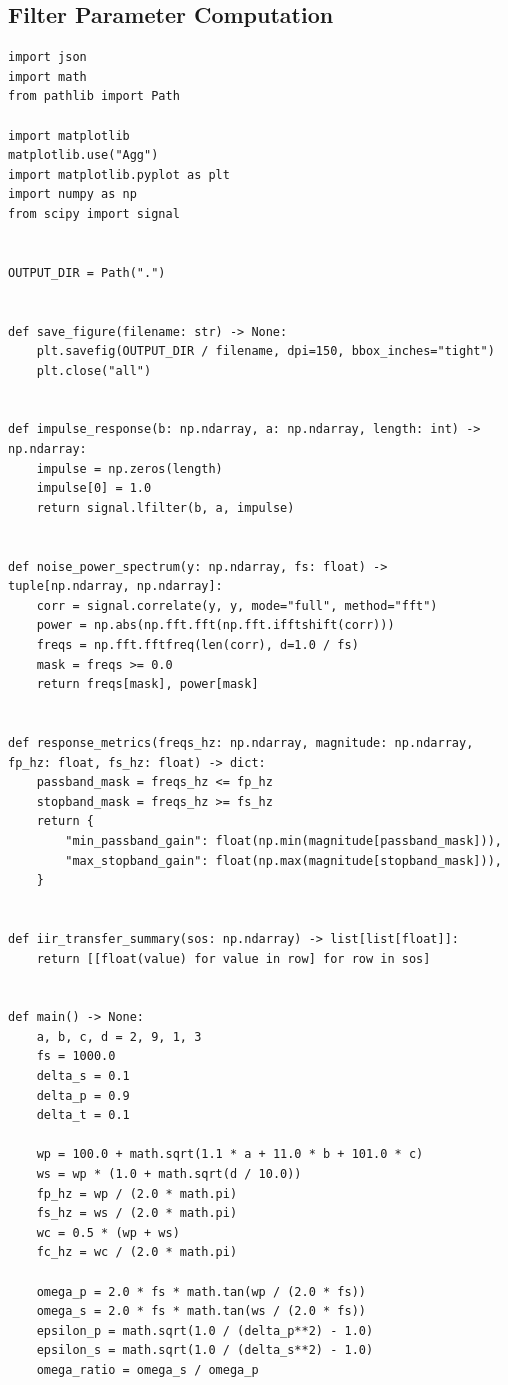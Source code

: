 \documentclass[12pt, a4paper]{article}
\begin{document}
\subsection{Filter Parameter Computation}
\begin{lstlisting}[caption={Imports, helper functions, and parameter computation for Lab 02.}, label={lst:lab02_params}]
import json
import math
from pathlib import Path

import matplotlib
matplotlib.use("Agg")
import matplotlib.pyplot as plt
import numpy as np
from scipy import signal


OUTPUT_DIR = Path(".")


def save_figure(filename: str) -> None:
    plt.savefig(OUTPUT_DIR / filename, dpi=150, bbox_inches="tight")
    plt.close("all")


def impulse_response(b: np.ndarray, a: np.ndarray, length: int) -> np.ndarray:
    impulse = np.zeros(length)
    impulse[0] = 1.0
    return signal.lfilter(b, a, impulse)


def noise_power_spectrum(y: np.ndarray, fs: float) -> tuple[np.ndarray, np.ndarray]:
    corr = signal.correlate(y, y, mode="full", method="fft")
    power = np.abs(np.fft.fft(np.fft.ifftshift(corr)))
    freqs = np.fft.fftfreq(len(corr), d=1.0 / fs)
    mask = freqs >= 0.0
    return freqs[mask], power[mask]


def response_metrics(freqs_hz: np.ndarray, magnitude: np.ndarray, fp_hz: float, fs_hz: float) -> dict:
    passband_mask = freqs_hz <= fp_hz
    stopband_mask = freqs_hz >= fs_hz
    return {
        "min_passband_gain": float(np.min(magnitude[passband_mask])),
        "max_stopband_gain": float(np.max(magnitude[stopband_mask])),
    }


def iir_transfer_summary(sos: np.ndarray) -> list[list[float]]:
    return [[float(value) for value in row] for row in sos]


def main() -> None:
    a, b, c, d = 2, 9, 1, 3
    fs = 1000.0
    delta_s = 0.1
    delta_p = 0.9
    delta_t = 0.1

    wp = 100.0 + math.sqrt(1.1 * a + 11.0 * b + 101.0 * c)
    ws = wp * (1.0 + math.sqrt(d / 10.0))
    fp_hz = wp / (2.0 * math.pi)
    fs_hz = ws / (2.0 * math.pi)
    wc = 0.5 * (wp + ws)
    fc_hz = wc / (2.0 * math.pi)

    omega_p = 2.0 * fs * math.tan(wp / (2.0 * fs))
    omega_s = 2.0 * fs * math.tan(ws / (2.0 * fs))
    epsilon_p = math.sqrt(1.0 / (delta_p**2) - 1.0)
    epsilon_s = math.sqrt(1.0 / (delta_s**2) - 1.0)
    omega_ratio = omega_s / omega_p


\end{lstlisting}
\end{document}
